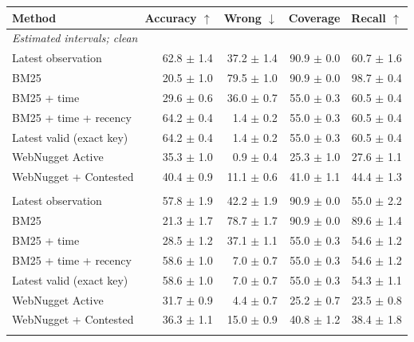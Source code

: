 \begin{tabular}{@{}lrrrr@{}}\toprule Method & Accuracy $\uparrow$ & Wrong $\downarrow$ & Coverage & Recall $\uparrow$\\\midrule
\multicolumn{5}{l}{\textit{Estimated intervals; clean}}\\
Latest observation & 62.8 $\pm$ 1.4 & 37.2 $\pm$ 1.4 & 90.9 $\pm$ 0.0 & 60.7 $\pm$ 1.6 \\
BM25 & 20.5 $\pm$ 1.0 & 79.5 $\pm$ 1.0 & 90.9 $\pm$ 0.0 & 98.7 $\pm$ 0.4 \\
BM25 + time & 29.6 $\pm$ 0.6 & 36.0 $\pm$ 0.7 & 55.0 $\pm$ 0.3 & 60.5 $\pm$ 0.4 \\
BM25 + time + recency & 64.2 $\pm$ 0.4 & 1.4 $\pm$ 0.2 & 55.0 $\pm$ 0.3 & 60.5 $\pm$ 0.4 \\
Latest valid (exact key) & 64.2 $\pm$ 0.4 & 1.4 $\pm$ 0.2 & 55.0 $\pm$ 0.3 & 60.5 $\pm$ 0.4 \\
WebNugget Active & 35.3 $\pm$ 1.0 & 0.9 $\pm$ 0.4 & 25.3 $\pm$ 1.0 & 27.6 $\pm$ 1.1 \\
WebNugget + Contested & 40.4 $\pm$ 0.9 & 11.1 $\pm$ 0.6 & 41.0 $\pm$ 1.1 & 44.4 $\pm$ 1.3 \\
\addlinespace
\multicolumn{5}{l}{\textit{Estimated intervals; 10\% corruption}}\\
Latest observation & 57.8 $\pm$ 1.9 & 42.2 $\pm$ 1.9 & 90.9 $\pm$ 0.0 & 55.0 $\pm$ 2.2 \\
BM25 & 21.3 $\pm$ 1.7 & 78.7 $\pm$ 1.7 & 90.9 $\pm$ 0.0 & 89.6 $\pm$ 1.4 \\
BM25 + time & 28.5 $\pm$ 1.2 & 37.1 $\pm$ 1.1 & 55.0 $\pm$ 0.3 & 54.6 $\pm$ 1.2 \\
BM25 + time + recency & 58.6 $\pm$ 1.0 & 7.0 $\pm$ 0.7 & 55.0 $\pm$ 0.3 & 54.6 $\pm$ 1.2 \\
Latest valid (exact key) & 58.6 $\pm$ 1.0 & 7.0 $\pm$ 0.7 & 55.0 $\pm$ 0.3 & 54.3 $\pm$ 1.1 \\
WebNugget Active & 31.7 $\pm$ 0.9 & 4.4 $\pm$ 0.7 & 25.2 $\pm$ 0.7 & 23.5 $\pm$ 0.8 \\
WebNugget + Contested & 36.3 $\pm$ 1.1 & 15.0 $\pm$ 0.9 & 40.8 $\pm$ 1.2 & 38.4 $\pm$ 1.8 \\
\addlinespace
\bottomrule\end{tabular}
